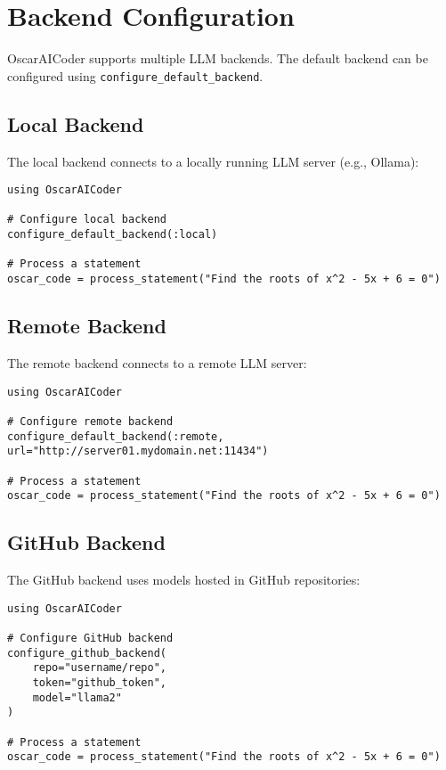 \documentclass[11pt,a4paper]{article}
\begin{document}
\section{Backend Configuration}

OscarAICoder supports multiple LLM backends. The default backend can be configured using \texttt{configure\_default\_backend}.

\subsection{Local Backend}

The local backend connects to a locally running LLM server (e.g., Ollama):

\begin{lstlisting}
using OscarAICoder

# Configure local backend
configure_default_backend(:local)

# Process a statement
oscar_code = process_statement("Find the roots of x^2 - 5x + 6 = 0")
\end{lstlisting}

\subsection{Remote Backend}

The remote backend connects to a remote LLM server:

\begin{lstlisting}
using OscarAICoder

# Configure remote backend
configure_default_backend(:remote, url="http://server01.mydomain.net:11434")

# Process a statement
oscar_code = process_statement("Find the roots of x^2 - 5x + 6 = 0")
\end{lstlisting}

\subsection{GitHub Backend}

The GitHub backend uses models hosted in GitHub repositories:

\begin{lstlisting}
using OscarAICoder

# Configure GitHub backend
configure_github_backend(
    repo="username/repo",
    token="github_token",
    model="llama2"
)

# Process a statement
oscar_code = process_statement("Find the roots of x^2 - 5x + 6 = 0")
\end{lstlisting}
\end{document}
